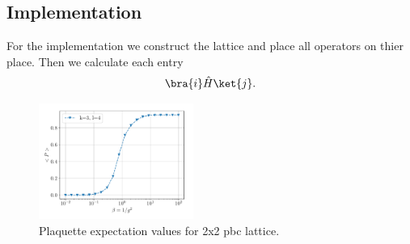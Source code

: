\subsection{Implementation}
For the implementation we construct the lattice and place all operators on thier place. Then we calculate each entry
\begin{align}
	\bra{i}\hat{H}\ket{j}.
\end{align}



\begin{figure}[h]
  \begin{center}
    \includegraphics[width=0.45\textwidth]{images/PlaquetteExp2x2PBC.pdf}
  \end{center}
  \caption{Plaquette expectation values for 2x2 pbc lattice.}
\end{figure}
